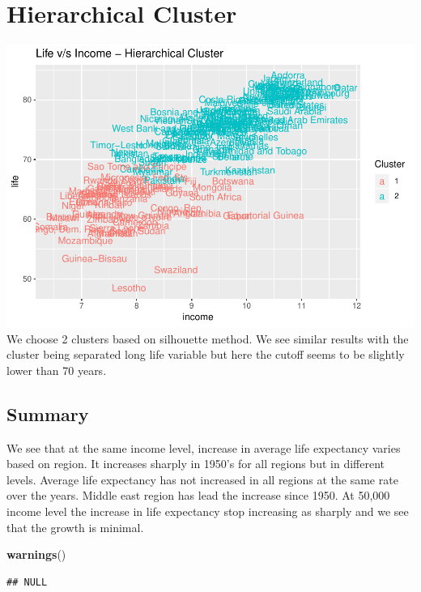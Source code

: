 \documentclass[]{article}
\newenvironment{Shaded}{\begin{snugshade}}{\end{snugshade}}
\newcommand{\KeywordTok}[1]{\textcolor[rgb]{0.13,0.29,0.53}{\textbf{#1}}}
\newcommand{\NormalTok}[1]{#1}
\begin{document}
\hypertarget{hierarchical-cluster}{%
\section{Hierarchical Cluster}\label{hierarchical-cluster}}

\includegraphics{Final_Project_files/figure-latex/Clustering Hierarchical-1.pdf}
We choose 2 clusters based on silhouette method. We see similar results
with the cluster being separated long life variable but here the cutoff
seems to be slightly lower than 70 years.

\hypertarget{summary}{%
\subsection{Summary}\label{summary}}

We see that at the same income level, increase in average life
expectancy varies based on region. It increases sharply in 1950's for
all regions but in different levels. Average life expectancy has not
increased in all regions at the same rate over the years. Middle east
region has lead the increase since 1950. At 50,000 income level the
increase in life expectancy stop increasing as sharply and we see that
the growth is minimal.

\begin{Shaded}
\begin{Highlighting}[]
\KeywordTok{warnings}\NormalTok{()}
\end{Highlighting}
\end{Shaded}

\begin{verbatim}
## NULL
\end{verbatim}
\end{document}
